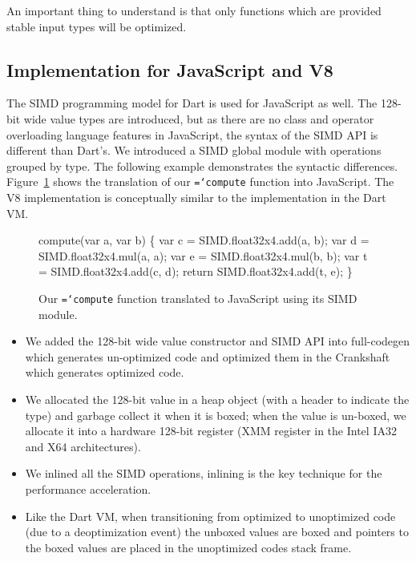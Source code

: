 \documentclass[preprint]{sigplanconf}
\newcommand{\ttt}[1]{{\texttt{\hyphenchar\font=`\-\relax #1}}}%
\begin{document}
An important thing to understand is that only functions which are provided
stable input types will be optimized.

\subsection{Implementation for JavaScript and V8}
\label{V8}

The SIMD programming model for Dart is used for JavaScript as well. The 128-bit
wide value types are introduced, but as there are no class and operator
overloading language features in JavaScript, the syntax of the SIMD API is
different than Dart's. We introduced a SIMD global module with operations
grouped by type. The following example demonstrates the syntactic differences.
Figure~\ref{fig:jssimd} shows the translation of our \ttt{compute} function
into JavaScript. The V8 implementation is conceptually similar to the
implementation in the Dart VM.

\begin{figure}
\begin{small}
\begin{program}[style=tt, number=true]
co\tab{}mpute(var a, var b) \{
  var c = SIMD.float32x4.add(a, b);
  var d = SIMD.float32x4.mul(a, a);
  var e = SIMD.float32x4.mul(b, b);
  var t = SIMD.float32x4.add(c, d);
  return SIMD.float32x4.add(t, e);\untab{}
\}
\end{program}
\end{small}
\caption{Our \ttt{compute} function translated to JavaScript using its
SIMD module.}
\label{fig:jssimd}
\end{figure}

\begin{itemize}
\item
We added the 128-bit wide value constructor and SIMD API into full-codegen which
generates un-optimized code and optimized them in the Crankshaft which generates
optimized code.

\item
We allocated the 128-bit value in a heap object (with a header to indicate the
type) and garbage collect it when it is boxed; when the value is un-boxed, we
allocate it into a hardware 128-bit register (XMM register in the Intel IA32 and
X64 architectures).

\item
We inlined all the SIMD operations, inlining is the key technique for the
performance acceleration.

\item
Like the Dart VM, when transitioning from optimized to unoptimized code (due to
a deoptimization event) the unboxed values are boxed and pointers to the boxed
values are placed in the unoptimized codes stack frame.

\end{itemize}
\end{document}

